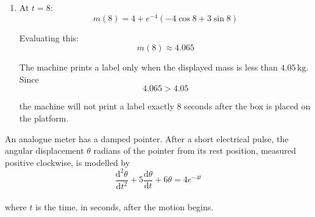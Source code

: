 \documentclass[leqno]{article}
\begin{document}
\begin{enumerate}[
  label=\textbf{\arabic*.},
  leftmargin=*,
  topsep=0pt,
  partopsep=0pt,
  parsep=0pt
]
\begin{djsSolution}
\begin{enumerate}[label=\textbf{(\alph*)}]
  so
  \[
  \tan t=-2
  \]

  The first positive solution is
  \[
  t=\pi-\arctan 2
  \]

  This is the first stationary point after \(t=0\), and since \(\frac{\mathrm{d}m}{\mathrm{d}t}>0\) initially and then changes to negative, it is a maximum.

  At this value of \(t\), the angle is in the second quadrant, so
  \[
  \cos t=-\frac{1}{\sqrt{5}},\qquad \sin t=\frac{2}{\sqrt{5}}
  \]

  Substituting into \(m\):
  \begin{align*}
  m_{\max}
  &=4+e^{-t/2}\left(-4\cos t+3\sin t\right)\\
  &=4+e^{-t/2}\left(-4\left(-\frac1{\sqrt5}\right)+3\left(\frac2{\sqrt5}\right)\right)\\
  &=4+e^{-t/2}\left(\frac4{\sqrt5}+\frac6{\sqrt5}\right)\\
  &=4+\frac{10}{\sqrt5}e^{-t/2}\\
  &=4+2\sqrt5\,e^{-t/2}
  \end{align*}

  where \(t=\pi-\arctan 2\). Hence
  \[
  m_{\max}=4+2\sqrt5\,e^{-(\pi-\arctan 2)/2}
  \]

  Later maxima occur after further oscillations, but the factor \(e^{-t/2}\) is smaller, so they are all less than this first one.

  Therefore the greatest value shown on the display is
  \[
  4+2\sqrt5\,e^{-(\pi-\arctan 2)/2}\approx 5.62\,\mathrm{kg}
  \]

  \item At \(t=8\):
  \[
  m(8)=4+e^{-4}(-4\cos 8+3\sin 8)
  \]

  Evaluating this:
  \[
  m(8)\approx 4.065
  \]

  The machine prints a label only when the displayed mass is less than \(4.05\,\mathrm{kg}\). Since
  \[
  4.065>4.05
  \]

  the machine will not print a label exactly \(8\) seconds after the box is placed on the platform.
\end{enumerate}
\end{djsSolution}


\newpage

\questionitem

An analogue meter has a damped pointer. After a short electrical pulse, the angular displacement $\theta$ radians of the pointer from its rest position, measured positive clockwise, is modelled by \\
\[\frac{\mathrm{d}^2 \theta}{\mathrm{d} t^2}+5\frac{\mathrm{d} \theta}{\mathrm{d} t}+6\theta=4e^{-4t}\] \\
where $t$ is the time, in seconds, after the motion begins. \\


\end{enumerate}
\end{document}
